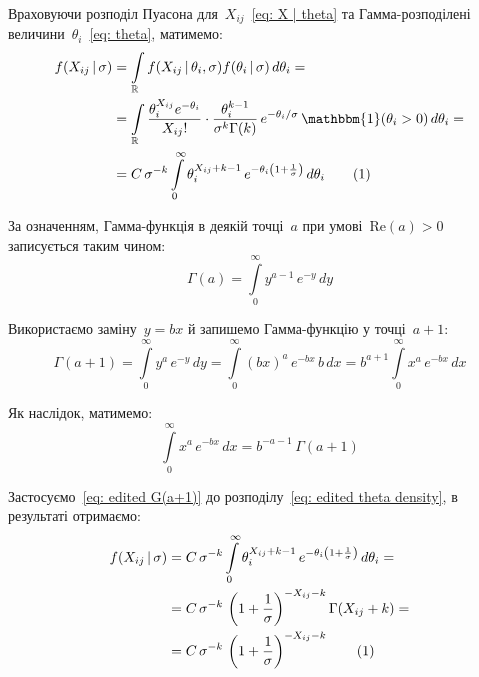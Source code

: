 \documentclass{mathreport}
\begin{document}
Враховуючи розподіл Пуасона для~$X_{ij}$~\eqref{eq: X | theta} та Гамма-розподілені величини~$\theta_i$~\eqref{eq: theta}, матимемо:
\begin{align*}\label{eq: edited theta density}
    f(X_{ij} \,|\, \sigma) & = \int\limits_{\mathbb{R}} f(X_{ij} \,|\, \theta_i,\sigma) f(\theta_i \,|\, \sigma)\, d\theta_i = \\
    & = \int\limits_{\mathbb{R}} \frac{\theta_i^{X_{ij}}e^{-\theta_i}}{X_{ij}!} \cdot \frac{\theta_{i}^{k-1}}{\sigma^{k}\Gamma(k)}\, e^{-\theta_i/\sigma}\, \mathbbm{1}(\theta_i>0)\, d\theta_i = \\
    & = C \, \sigma^{-k} \int\limits_{0}^{\infty} \theta_{i}^{X_{ij}+k-1}\, e^{-\theta_{i}\left( 1+\frac{1}{\sigma} \right)} \, d\theta_i \stepcounter{equation}\tag{\theequation}
\end{align*}

За означенням, Гамма-функція в деякій точці~$a$ при умові~$\mathrm{Re}(a)>0$ записується таким чином:
\begin{equation}\label{eq: G(a+1)}
    \Gamma(a) = \int\limits_{0}^{\infty}y^{a-1}\,e^{-y}\,dy
\end{equation}

Використаємо заміну~$y=bx$ й запишемо Гамма-функцію у точці~$a+1:$
\begin{equation}
    \Gamma(a+1) = \int\limits_{0}^{\infty}y^{a}\,e^{-y}\,dy = \int\limits_{0}^{\infty}(bx)^{a}\,e^{-bx}\,b\,dx = b^{a+1}\int\limits_{0}^{\infty}x^{a}\,e^{-bx}\,dx
\end{equation}

Як наслідок, матимемо:
\begin{equation}\label{eq: edited G(a+1)}
    \int\limits_{0}^{\infty}x^{a}\,e^{-bx}\,dx = b^{-a-1}\,\Gamma(a+1)
\end{equation}

Застосуємо~\eqref{eq: edited G(a+1)} до розподілу~\eqref{eq: edited theta density}, в результаті отримаємо:
\begin{align*}\label{eq: final theta density}
    f(X_{ij} \,|\, \sigma) & = C \, \sigma^{-k} \int\limits_{0}^{\infty} \theta_{i}^{X_{ij}+k-1}\, e^{-\theta_{i}\left( 1+\frac{1}{\sigma} \right)} \, d\theta_i = \\
    & = C \, \sigma^{-k}\, \left( 1+\frac{1}{\sigma}\right)^{-X_{ij}-k}\Gamma(X_{ij}+k) = \\
    & = C \, \sigma^{-k}\, \left( 1+\frac{1}{\sigma}\right)^{-X_{ij}-k} \stepcounter{equation}\tag{\theequation}
\end{align*}
\end{document}
